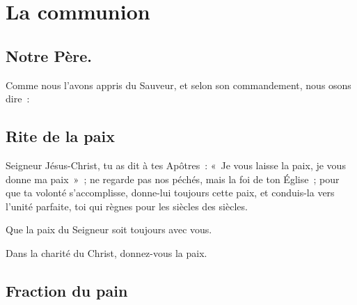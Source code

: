 





\section{La communion}

\subsection{Notre Père.}


Comme nous l'avons appris du Sauveur, et selon son commandement, nous
osons dire~:


\subsection{Rite de la paix}

Seigneur Jésus-Christ, tu as dit à tes Apôtres~: «~Je vous laisse la            
paix, je vous donne ma paix~»~; ne regarde pas nos péchés, mais la
foi de ton Église~; pour que ta volonté s'accomplisse, donne-lui
toujours cette paix, et conduis-la vers l'unité parfaite, toi qui
règnes pour les siècles des siècles.


Que la paix du Seigneur soit toujours avec vous.


Dans la charité du Christ, donnez-vous la paix.

\subsection{Fraction du pain}

